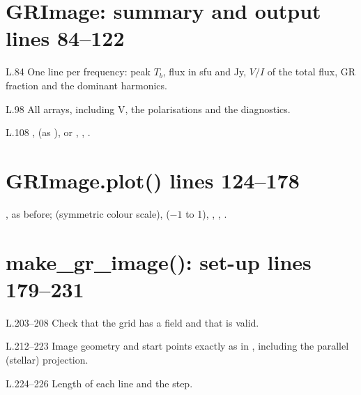 \section*{\normalsize GRImage: summary and output \hfill{\small\mdseries\color{gray}lines 84--122}}

\begin{lines}
\item[L.84] One line per frequency: peak $T_b$, flux in sfu and Jy, $V/I$ of the total flux, GR fraction and the dominant harmonics.
\item[L.98] All arrays, including V, the polarisations and the diagnostics.
\item[L.108] ,  (as ), or , , .
\end{lines}
\section*{\normalsize GRImage.plot() \hfill{\small\mdseries\color{gray}lines 124--178}}

,  as before;  (symmetric colour scale),  ($-1$ to 1), , , .

\section*{\normalsize make\_gr\_image(): set-up \hfill{\small\mdseries\color{gray}lines 179--231}}

\begin{lines}
\item[L.203–208] Check that the grid has a field and that  is valid.
\item[L.212–223] Image geometry and start points exactly as in , including the parallel (stellar) projection.
\item[L.224–226] Length of each line and the step.
\end{lines}
